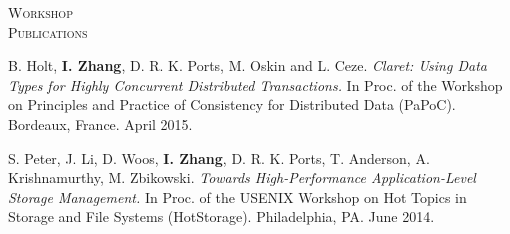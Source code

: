 \documentclass[10pt,times]{report}
\newlength{\sectiongap}
\newlength{\sectioncolwidth}
\newlength{\colgap}
\newlength{\stuffwidth}
\newenvironment{rtable}{
  \begin{minipage}{\textwidth}
  }{
  \end{minipage}
}
\newenvironment{rsection}[1]{
  \begin{minipage}[t]{\sectioncolwidth}
    \textsc{#1}
  \end{minipage}
  \hspace{\colgap}
  \begin{minipage}[t]{\stuffwidth}
  }{
    \removelastskip
  \end{minipage}
  \\[\sectiongap]
}
\begin{document}
\begin{rtable}
\begin{rsection}{Workshop\\Publications}
    B. Holt, \textbf{I. Zhang}, D. R. K. Ports, M. Oskin and L. Ceze.
    \textit{Claret: Using Data Types for Highly Concurrent Distributed
      Transactions.} In Proc. of the Workshop on Principles and
    Practice of Consistency for Distributed Data (PaPoC).  Bordeaux,
    France. April 2015.\\\vspace{-0.5em}

    S. Peter, J. Li, D. Woos, \textbf{I. Zhang}, D. R. K. Ports,
    T. Anderson, A. Krishnamurthy, M. Zbikowski. \textit{Towards
      High-Performance Application-Level Storage Management.} In
    Proc. of the USENIX Workshop on Hot Topics in Storage and
    File Systems (HotStorage). Philadelphia, PA. June
    2014.
  \end{rsection}

\end{rtable}
\end{document}
